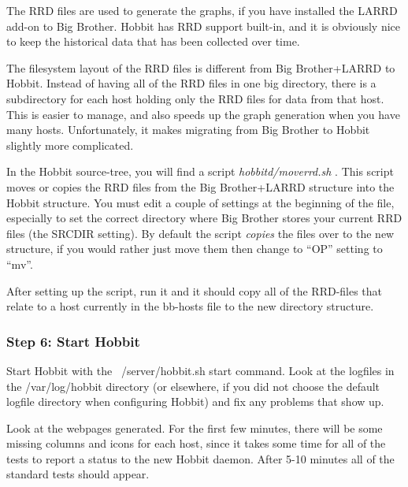  The RRD files are used to generate the graphs, if you have installed the LARRD add-on to Big Brother. Hobbit has RRD support built-in, and it is obviously nice to keep the historical data that has been collected over time.


 The filesystem layout of the RRD files is different from Big Brother+LARRD to Hobbit. Instead of having all of the RRD files in one big directory, there is a subdirectory for each host holding only the RRD files for data from that host. This is easier to manage, and also speeds up the graph generation when you have many hosts. Unfortunately, it makes migrating from Big Brother to Hobbit slightly more complicated.


 In the Hobbit source-tree, you will find a script \emph{hobbitd/moverrd.sh}
. This script moves or copies the RRD files from the Big Brother+LARRD structure into the Hobbit structure. You must edit a couple of settings at the beginning of the file, especially to set the correct directory where Big Brother stores your current RRD files (the SRCDIR setting). By default the script \emph{copies}
 the files over to the new structure, if you would rather just move them then change to ``OP'' setting to ``mv''.


 After setting up the script, run it and it should copy all of the RRD-files that relate to a host currently in the bb-hosts file to the new directory structure.
\subsubsection{Step 6: Start Hobbit}


 Start Hobbit with the ~/server/hobbit.sh start command. Look at the logfiles in the /var/log/hobbit directory (or elsewhere, if you did not choose the default logfile directory when configuring Hobbit) and fix any problems that show up.


 Look at the webpages generated. For the first few minutes, there will be some missing columns and icons for each host, since it takes some time for all of the tests to report a status to the new Hobbit daemon. After 5-10 minutes all of the standard tests should appear.

